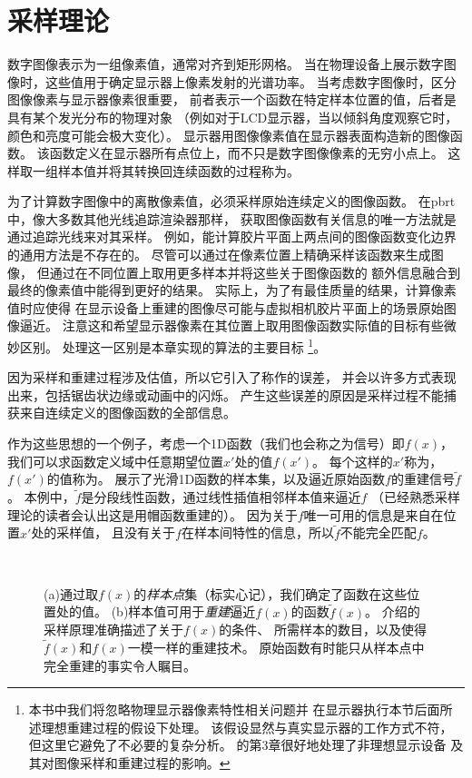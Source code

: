 \section{采样理论}\label{sec:采样理论}
数字图像表示为一组像素值，通常对齐到矩形网格。
当在物理设备上展示数字图像时，这些值用于确定显示器上像素发射的光谱功率。
当考虑数字图像时，区分图像像素与显示器像素很重要，
前者表示一个函数在特定样本位置的值，后者是具有某个发光分布的物理对象
（例如对于LCD显示器，当以倾斜角度观察它时，颜色和亮度可能会极大变化）。
显示器用图像像素值在显示器表面构造新的图像函数。
该函数定义在显示器所有点位上，而不只是数字图像像素的无穷小点上。
这样取一组样本值并将其转换回连续函数的过程称为。

为了计算数字图像中的离散像素值，必须采样原始连续定义的图像函数。
在pbrt中，像大多数其他光线追踪渲染器那样，
获取图像函数有关信息的唯一方法就是通过追踪光线来对其采样。
例如，能计算胶片平面上两点间的图像函数变化边界的通用方法是不存在的。
尽管可以通过在像素位置上精确采样该函数来生成图像，
但通过在不同位置上取用更多样本并将这些关于图像函数的
额外信息融合到最终的像素值中能得到更好的结果。
实际上，为了有最佳质量的结果，计算像素值时应使得
在显示设备上重建的图像尽可能与虚拟相机胶片平面上的场景原始图像逼近。
注意这和希望显示器像素在其位置上取用图像函数实际值的目标有些微妙区别。
处理这一区别是本章实现的算法的主要目标
\footnote{本书中我们将忽略物理显示器像素特性相关问题并
    在显示器执行本节后面所述理想重建过程的假设下处理。
    该假设显然与真实显示器的工作方式不符，但这里它避免了不必要的复杂分析。
    \citet{GLASSNER1995}的第3章很好地处理了非理想显示设备
    及其对图像采样和重建过程的影响。}。

因为采样和重建过程涉及估值，所以它引入了称作的误差，
并会以许多方式表现出来，包括锯齿状边缘或动画中的闪烁。
产生这些误差的原因是采样过程不能捕获来自连续定义的图像函数的全部信息。

作为这些思想的一个例子，考虑一个1D函数（我们也会称之为信号）即$f(x)$，
我们可以求函数定义域中任意期望位置$x'$处的值$f(x')$。
每个这样的$x'$称为，
$f(x')$的值称为。
展示了光滑1D函数的样本集，以及逼近原始函数$f$的重建信号$\tilde{f}$。
本例中，$\tilde{f}$是分段线性函数，通过线性插值相邻样本值来逼近$f$
（已经熟悉采样理论的读者会认出这是用帽函数重建的）。
因为关于$f$唯一可用的信息是来自在位置$x'$处的采样值，
且没有关于$f$在样本间特性的信息，所以$\tilde{f}$不能完全匹配$f$。
\begin{figure}[htbp]
    \centering
    \,\,
    \caption{(a)通过取$f(x)$的\emph{样本点}集（标实心记），我们确定了函数在这些位置处的值。
        (b)样本值可用于\emph{重建}逼近$f(x)$的函数$\tilde{f}(x)$。
        介绍的采样原理准确描述了关于$f(x)$的条件、
        所需样本的数目，以及使得$\tilde{f}(x)$和$f(x)$一模一样的重建技术。
        原始函数有时能只从样本点中完全重建的事实令人瞩目。}
    \label{fig:7.1}
\end{figure}

